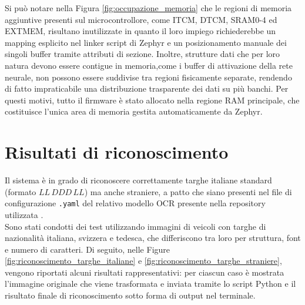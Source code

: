 Si può notare nella Figura \ref{fig:occupazione_memoria} che le regioni di memoria aggiuntive presenti sul microcontrollore, come ITCM, DTCM, SRAM0-4 ed EXTMEM, risultano inutilizzate in quanto il loro impiego richiederebbe un mapping esplicito nel linker script di Zephyr e un posizionamento manuale dei singoli buffer tramite attributi di sezione. Inoltre, strutture dati che per loro natura devono essere contigue in memoria,come i buffer di attivazione della rete neurale, non possono essere suddivise tra regioni fisicamente separate, rendendo di fatto impraticabile una distribuzione trasparente dei dati su più banchi. Per questi motivi, tutto il firmware è stato allocato nella regione RAM principale, che costituisce l'unica area di memoria gestita automaticamente da Zephyr.

\section{Risultati di riconoscimento}
\label{sec:risultati-riconoscimento}

Il sistema è in grado di riconoscere correttamente targhe italiane standard (formato $LL\,DDD\,LL$) ma anche straniere, a patto che siano presenti nel file di configurazione \texttt{.yaml} del relativo modello OCR presente nella repository utilizzata \cite{ankandrew_2024_fastplateocr}. \\
Sono stati condotti dei test utilizzando immagini di veicoli con targhe di nazionalità italiana, svizzera e tedesca, che differiscono tra loro per struttura, font e numero di caratteri. Di seguito, nelle Figure \ref{fig:riconoscimento_targhe_italiane} e \ref{fig:riconoscimento_targhe_straniere}, vengono riportati alcuni risultati rappresentativi: per ciascun caso è mostrata l'immagine originale che viene trasformata e inviata tramite lo script Python e il risultato finale di riconoscimento sotto forma di output nel terminale.

